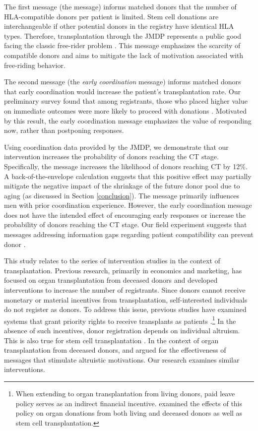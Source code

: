 \documentclass[12pt, a4paper]{article}
\newcommand{\revise}[1]{{\color{red}{#1}}}
\begin{document}
The first message (the \emph{\revise{matching difficulty}} message) informs matched donors that the number of HLA-compatible donors per patient is limited. Stem cell donations are interchangeable if other potential donors in the registry have identical HLA types. Therefore, transplantation through the JMDP represents a public good facing the classic free-rider problem \citep{Bergstrom2009}. This message emphasizes the scarcity of compatible donors and aims to mitigate the lack of motivation associated with free-riding behavior.

The second message (the \emph{early coordination} message) informs matched donors that early coordination would increase the patient's transplantation rate. Our preliminary survey found that among registrants, those who placed higher value on immediate outcomes were more likely to proceed with donations \citep{Ohtake2020}. Motivated by this result, the early coordination message emphasizes the value of responding now, rather than postponing responses.

Using coordination data provided by the JMDP, we demonstrate that our intervention increases the probability of donors reaching the CT stage. Specifically, the \revise{matching difficulty} message increases the likelihood of donors reaching CT by 12\%. A back-of-the-envelope calculation suggests that this positive effect may partially mitigate the negative impact of the shrinkage of the future donor pool due to aging (as discussed in Section \ref{conclusion}). The \revise{matching difficulty} message primarily influences men with prior coordination experience. However, the early coordination message does not have the intended effect of encouraging early responses or increase the probability of donors reaching the CT stage. Our field experiment suggests that messages addressing information gaps regarding patient compatibility can prevent donor \revise{dropout}.

This study relates to the series of intervention studies in the context of transplantation. Previous research, primarily in economics and marketing, has focused on organ transplantation from deceased donors and developed interventions to increase the number of registrants. Since donors cannot receive monetary or material incentives from transplantation, self-interested individuals do not register as donors. To address this issue, previous studies have examined systems that grant priority rights to receive transplants as patients \citep{Kessler2012, Li2013, Stoler2017}.\footnote{When extending to organ transplantation from living donors, paid leave policy serves as an indirect financial incentive. \citet{Lacetera2014} examined the effects of this policy on organ donations from both living and deceased donors as well as stem cell transplantation.} In the absence of such incentives, donor registration depends on individual altruism. This is also true for stem cell transplantation \citep{Bergstrom2009, Ohtake2020}. In the context of organ transplantation from deceased donors, \citet{Sallis2018} and \citet{Robitaille2021} argued for the effectiveness of messages that stimulate altruistic motivations. Our research examines similar interventions.
\end{document}
